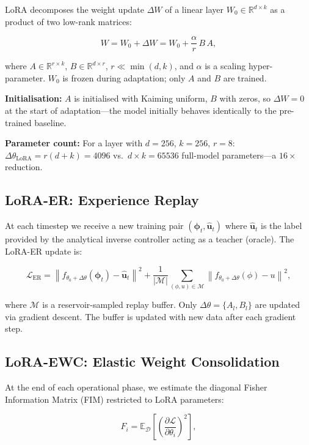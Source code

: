 \documentclass[journal]{IEEEtran}
\newcommand{\R}{\mathbb{R}}
\newcommand{\norm}[1]{\left\lVert #1 \right\rVert}
\newcommand{\bu}{\bm{u}}
\begin{document}
LoRA decomposes the weight update $\Delta W$ of a linear layer
$W_0 \in \R^{d \times k}$ as a product of two low-rank matrices:

\begin{equation}
  W = W_0 + \Delta W = W_0 + \frac{\alpha}{r}\, B\, A,
  \label{eq:lora}
\end{equation}

where $A \in \R^{r \times k}$, $B \in \R^{d \times r}$, $r \ll \min(d,k)$,
and $\alpha$ is a scaling hyper-parameter. $W_0$ is frozen during adaptation;
only $A$ and $B$ are trained.

\textbf{Initialisation:} $A$ is initialised with Kaiming uniform,
$B$ with zeros, so $\Delta W = 0$ at the start of adaptation—the model
initially behaves identically to the pre-trained baseline.

\textbf{Parameter count:} For a layer with $d = 256$, $k = 256$,
$r = 8$: $\Delta\theta_\text{LoRA} = r(d+k) = 4096$ vs.\
$d \times k = 65536$ full-model parameters—a $16\times$ reduction.

\subsection{LoRA-ER: Experience Replay}

At each timestep we receive a new training pair $(\bm{\phi}_t, \hat{\bu}_t)$
where $\hat{\bu}_t$ is the label provided by the analytical inverse controller
acting as a teacher (oracle). The LoRA-ER update is:

\begin{equation}
  \mathcal{L}_\text{ER} = \norm{f_{\theta_0 + \Delta\theta}(\bm{\phi}_t) - \hat{\bu}_t}^2
  + \frac{1}{|\mathcal{M}|}\sum_{(\phi,u) \in \mathcal{M}}
    \norm{f_{\theta_0 + \Delta\theta}(\phi) - u}^2,
\end{equation}

where $\mathcal{M}$ is a reservoir-sampled replay buffer. Only
$\Delta\theta = \{A_l, B_l\}$ are updated via gradient descent.
The buffer is updated with new data after each gradient step.

\subsection{LoRA-EWC: Elastic Weight Consolidation}

At the end of each operational phase, we estimate the diagonal Fisher
Information Matrix (FIM) restricted to LoRA parameters:

\begin{equation}
  F_i = \mathbb{E}_{\mathcal{D}}\!\left[
    \left(\frac{\partial \mathcal{L}}{\partial \theta_i}\right)^{\!2}
  \right],
\end{equation}
\end{document}
